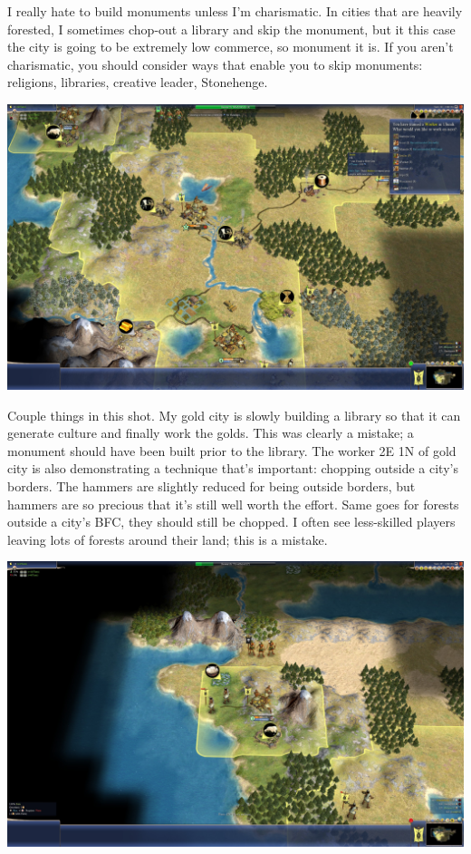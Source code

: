 \documentclass[10pt]{article}
\begin{document}
I really hate to build monuments unless I'm charismatic. In cities that are heavily forested, I sometimes
chop-out a library and skip the monument, but it this case the city is going to be extremely low commerce,
so monument it is. If you aren't charismatic, you should consider ways that enable you to skip monuments:
religions, libraries, creative leader, Stonehenge.

\includegraphics[width=1.0\textwidth]{31}

Couple things in this shot. My gold city is slowly building a library so that it can generate culture and
finally work the golds. This was clearly a mistake; a monument should have been built prior to the library.
The worker 2E 1N of gold city is also demonstrating a technique that's important: chopping outside a city's
borders. The hammers are slightly reduced for being outside borders, but hammers are so precious that it's
still well worth the effort. Same goes for forests outside a city's BFC, they should still be chopped. I
often see less-skilled players leaving lots of forests around their land; this is a mistake.

\includegraphics[width=1.0\textwidth]{34}
\end{document}
